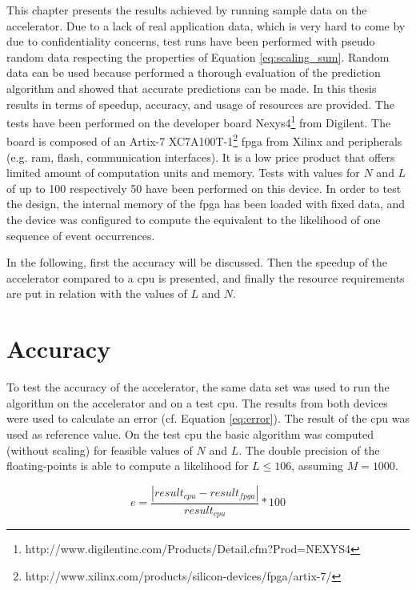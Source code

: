 \documentclass[mscthesis]{usiinfthesis}
\begin{document}
This chapter presents the results achieved by running sample data on the
accelerator. Due to a lack of real application data, which is very hard to come
by due to confidentiality concerns, test runs have been performed with pseudo
random data respecting the properties of Equation \ref{eq:scaling_sum}. Random
data can be used because \cite{salfner08} performed a thorough evaluation of
the prediction algorithm and showed that accurate predictions can be made. In
this thesis results in terms of speedup, accuracy, and usage of resources are
provided. The tests have been performed on the developer board
Nexys4\footnote{http://www.digilentinc.com/Products/Detail.cfm?Prod=NEXYS4}
from Digilent. The board is composed of an Artix-7
XC7A100T-1\footnote{http://www.xilinx.com/products/silicon-devices/fpga/artix-7/}
\gls{fpga} from Xilinx and peripherals (e.g. \gls{ram}, flash, communication
interfaces). It is a low price product that offers limited amount of
computation units and memory. Tests with values for $N$ and $L$ of up to 100
respectively 50 have been performed on this device. In order to test the
design, the internal memory of the \gls{fpga} has been loaded with fixed data,
and the device was configured to compute the equivalent to the likelihood of
one sequence of event occurrences.

In the following, first the accuracy will be discussed. Then the speedup of the
accelerator compared to a \gls{cpu} is presented, and finally the resource
requirements are put in relation with the values of $L$ and $N$.

\section{Accuracy}

To test the accuracy of the accelerator, the same data set was used to run the
algorithm on the accelerator and on a test \gls{cpu}. The results from both
devices were used to calculate an error (cf. Equation \ref{eq:error}). The
result of the \gls{cpu} was used as reference value. On the test \gls{cpu} the basic
algorithm was computed (without scaling) for feasible values of $N$ and $L$.
The double precision of the floating-points is able to compute a likelihood for
$L \leq 106$, assuming $M=1000$.

\begin{equation}
    \label{eq:error}
    e = \frac{|result_{cpu}-result_{fpga}|}{result_{cpu}}*100
\end{equation}
\end{document}
